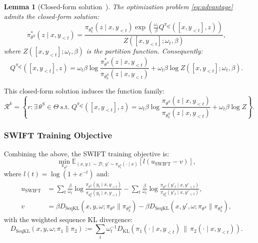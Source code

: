 \documentclass[11pt,a4paper]{article}
\newtheorem{lemma}[theorem]{Lemma}
\newcommand{\E}{\mathbb{E}}
\newcommand{\DKL}{D_{\mathrm{KL}}}
\newcommand{\DSeqKL}{D_{\mathrm{SeqKL}}}
\begin{document}
\begin{lemma}[Closed-form solution~\cite{le2025swift}]
\label{lem:closed_form}
The optimization problem \eqref{eq:advantage} admits the closed-form solution:
\begin{equation}
    \pi^*_{\theta^S}(z \mid x, y_{<t}) = \frac{\pi_{\theta^S_k}(z \mid x, y_{<t}) \exp\!\left(\frac{\omega_t}{\beta} Q^{\pi_{\theta^S_k}}([x, y_{<t}], z)\right)}{Z([x, y_{<t}]; \omega_t, \beta)},
    \label{eq:closed_form}
\end{equation}
where $Z([x, y_{<t}]; \omega_t, \beta)$ is the partition function. Consequently:
\begin{equation}
    Q^{\pi_{\theta^S_k}}([x, y_{<t}], z) = \omega_t \beta \log \frac{\pi^*_{\theta^S}(z \mid x, y_{<t})}{\pi_{\theta^S_k}(z \mid x, y_{<t})} + \omega_t \beta \log Z([x, y_{<t}]; \omega_t, \beta).
    \label{eq:q_function}
\end{equation}
\end{lemma}

This closed-form solution induces the function family:
\begin{equation}
    \mathcal{R}^k = \left\{ r : \exists\, \theta^S \in \Theta \;\text{s.t.}\; Q^{\pi_{\theta^S_k}}([x, y_{<t}], z) = \omega_t \beta \log \frac{\pi_{\theta^S}(z \mid x, y_{<t})}{\pi_{\theta^S_k}(z \mid x, y_{<t})} + \omega_t \beta \log Z \right\}.
    \label{eq:function_family}
\end{equation}

\subsubsection{SWIFT Training Objective}

Combining the above, the SWIFT training objective is:
\begin{equation}
    \min_{\pi_{\theta^S}} \E_{(x,y) \sim \mathcal{D},\, y' \sim \pi_{\theta^S_k}(\cdot \mid x)} \left[ l\!\left(u_{\mathrm{SWIFT}} - v\right) \right],
    \label{eq:swift_objective}
\end{equation}
where $l(t) = \log(1 + e^{-t})$ and:
\begin{align}
    u_{\mathrm{SWIFT}} &= \sum_t \frac{\beta}{\omega_t} \log \frac{\pi_{\theta^S}(y_t \mid x, y_{<t})}{\pi_{\theta^S_k}(y_t \mid x, y_{<t})} - \sum_t \frac{\beta}{\omega_t} \log \frac{\pi_{\theta^S}(y'_t \mid x, y'_{<t})}{\pi_{\theta^S_k}(y'_t \mid x, y'_{<t})}, \label{eq:u_swift} \\
    v &= \beta \DSeqKL(x, y, \omega; \pi_{\theta^S} \| \pi_{\theta^S_k}) - \beta \DSeqKL(x, y', \omega; \pi_{\theta^S} \| \pi_{\theta^S_k}), \label{eq:v}
\end{align}
with the weighted sequence KL divergence:
\begin{equation}
    \DSeqKL(x, y, \omega; \pi_1 \| \pi_2) := \sum_t \omega_t^{-1} \DKL\!\left(\pi_1(\cdot \mid x, y_{<t}) \,\|\, \pi_2(\cdot \mid x, y_{<t})\right).
    \label{eq:seq_kl}
\end{equation}
\end{document}
